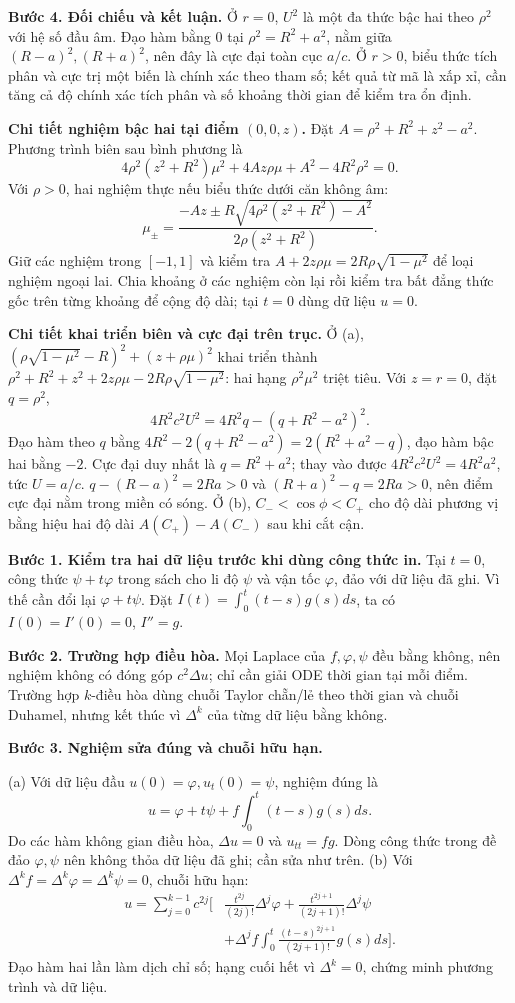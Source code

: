 \textbf{Bước 4. Đối chiếu và kết luận.} Ở $r=0$, $U^2$ là một đa thức bậc hai theo $\rho^2$ với hệ số đầu âm. Đạo hàm bằng $0$ tại $\rho^2=R^2+a^2$, nằm giữa $(R-a)^2,(R+a)^2$, nên đây là cực đại toàn cục $a/c$. Ở $r>0$, biểu thức tích phân và cực trị một biến là chính xác theo tham số; kết quả từ mã là xấp xỉ, cần tăng cả độ chính xác tích phân và số khoảng thời gian để kiểm tra ổn định.

\textbf{Chi tiết nghiệm bậc hai tại điểm $(0,0,z)$.} Đặt $A=\rho^2+R^2+z^2-a^2$. Phương trình biên sau bình phương là
\[4\rho^2(z^2+R^2)\mu^2+4Az\rho\mu+A^2-4R^2\rho^2=0.\]
Với $\rho>0$, hai nghiệm thực nếu biểu thức dưới căn không âm:
\[\mu_\pm=\frac{-Az\pm R\sqrt{4\rho^2(z^2+R^2)-A^2}}{2\rho(z^2+R^2)}.\]
Giữ các nghiệm trong $[-1,1]$ và kiểm tra $A+2z\rho\mu=2R\rho\sqrt{1-\mu^2}$ để loại nghiệm ngoại lai. Chia khoảng ở các nghiệm còn lại rồi kiểm tra bất đẳng thức gốc trên từng khoảng để cộng độ dài; tại $t=0$ dùng dữ liệu $u=0$.

\textbf{Chi tiết khai triển biên và cực đại trên trục.} Ở (a), $(\rho\sqrt{1-\mu^2}-R)^2+(z+\rho\mu)^2$ khai triển thành $\rho^2+R^2+z^2+2z\rho\mu-2R\rho\sqrt{1-\mu^2}$: hai hạng $\rho^2\mu^2$ triệt tiêu. Với $z=r=0$, đặt $q=\rho^2$,
\[4R^2c^2U^2=4R^2q-(q+R^2-a^2)^2.\]
Đạo hàm theo $q$ bằng $4R^2-2(q+R^2-a^2)=2(R^2+a^2-q)$, đạo hàm bậc hai bằng $-2$. Cực đại duy nhất là $q=R^2+a^2$; thay vào được $4R^2c^2U^2=4R^2a^2$, tức $U=a/c$. $q-(R-a)^2=2Ra>0$ và $(R+a)^2-q=2Ra>0$, nên điểm cực đại nằm trong miền có sóng. Ở (b), $C_-<\cos\phi<C_+$ cho độ dài phương vị bằng hiệu hai độ dài $A(C_+)-A(C_-)$ sau khi cắt cận.

\textbf{Bước 1. Kiểm tra hai dữ liệu trước khi dùng công thức in.} Tại $t=0$, công thức $\psi+t\varphi$ trong sách cho li độ $\psi$ và vận tốc $\varphi$, đảo với dữ liệu đã ghi. Vì thế cần đổi lại $\varphi+t\psi$. Đặt $I(t)=\int_0^t(t-s)g(s)ds$, ta có $I(0)=I'(0)=0$, $I''=g$.

\textbf{Bước 2. Trường hợp điều hòa.} Mọi Laplace của $f,\varphi,\psi$ đều bằng không, nên nghiệm không có đóng góp $c^2\Delta u$; chỉ cần giải ODE thời gian tại mỗi điểm. Trường hợp $k$-điều hòa dùng chuỗi Taylor chẵn/lẻ theo thời gian và chuỗi Duhamel, nhưng kết thúc vì $\Delta^k$ của từng dữ liệu bằng không.

\textbf{Bước 3. Nghiệm sửa đúng và chuỗi hữu hạn.}

(a) Với dữ liệu đầu $u(0)=\varphi,u_t(0)=\psi$, nghiệm đúng là
\[u=\varphi+t\psi+f\int_0^t(t-s)g(s)ds.\]
Do các hàm không gian điều hòa, $\Delta u=0$ và $u_{tt}=fg$. Dòng công thức trong đề đảo $\varphi,\psi$ nên không thỏa dữ liệu đã ghi; cần sửa như trên.
(b) Với $\Delta^kf=\Delta^k\varphi=\Delta^k\psi=0$, chuỗi hữu hạn:
\begin{align*}
u=\sum_{j=0}^{k-1}c^{2j}\bigg[&\frac{t^{2j}}{(2j)!}\Delta^j\varphi+\frac{t^{2j+1}}{(2j+1)!}\Delta^j\psi\\
&+\Delta^jf\int_0^t\frac{(t-s)^{2j+1}}{(2j+1)!}g(s)ds\bigg].
\end{align*}
Đạo hàm hai lần làm dịch chỉ số; hạng cuối hết vì $\Delta^k=0$, chứng minh phương trình và dữ liệu.


